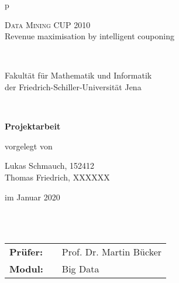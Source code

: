 \begin{center}
\begin{tabular}{p{\textwidth}}






\begin{center}
\LARGE{\textsc{
Data Mining CUP 2010
}} \\
Revenue maximisation by intelligent couponing
\end{center}

\\


\begin{center}
\large{Fakultät für Mathematik und Informatik\\
der Friedrich-Schiller-Universität Jena \\}
\end{center}

\\

\begin{center}
\textbf{\Large{Projektarbeit}}
\end{center}




\begin{center}
vorgelegt von
\end{center}

\begin{center}
Lukas Schmauch, 152412 \\
Thomas Friedrich, XXXXXX \\
\end{center}

\begin{center}
\large{im Januar 2020}
\end{center}

\\

\\



\begin{center}
\begin{tabular}{lll}
\textbf{Prüfer:} & & Prof. Dr. Martin Bücker\\
\textbf{Modul:} & & Big Data\\
\end{tabular}
\end{center}

\end{tabular}
\end{center}